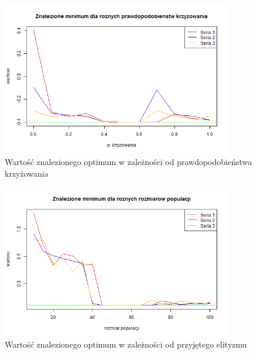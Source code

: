 \documentclass[11pt, a4paper]{article}
\begin{document}
\begin{figure}[H]
	\begin{center}
		\includegraphics[width=0.9\textwidth]{./assets/CosMix43.png} %
		\caption{Wartość znalezionego optimum w zależności od prawdopodobieństwa krzyżowania}
		\label{fig:cosmix43}
	\end{center}
\end{figure}

\begin{figure}[H]
	\begin{center}
		\includegraphics[width=0.9\textwidth]{./assets/CosMix44.png} %
		\caption{Wartość znalezionego optimum w zależności od przyjętego elityzmu}
		\label{fig:cosmix44}
	\end{center}
\end{figure}
\end{document}
